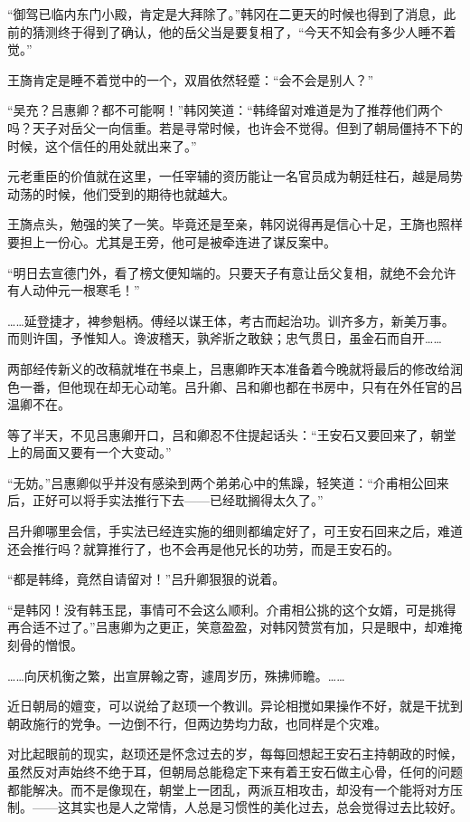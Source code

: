“御驾已临内东门小殿，肯定是大拜除了。”韩冈在二更天的时候也得到了消息，此前的猜测终于得到了确认，他的岳父当是要复相了，“今天不知会有多少人睡不着觉。”

王旖肯定是睡不着觉中的一个，双眉依然轻蹙：“会不会是别人？”

“吴充？吕惠卿？都不可能啊！”韩冈笑道：“韩绛留对难道是为了推荐他们两个吗？天子对岳父一向信重。若是寻常时候，也许会不觉得。但到了朝局僵持不下的时候，这个信任的用处就出来了。”

元老重臣的价值就在这里，一任宰辅的资历能让一名官员成为朝廷柱石，越是局势动荡的时候，他们受到的期待也就越大。

王旖点头，勉强的笑了一笑。毕竟还是至亲，韩冈说得再是信心十足，王旖也照样要担上一份心。尤其是王旁，他可是被牵连进了谋反案中。

“明日去宣德门外，看了榜文便知端的。只要天子有意让岳父复相，就绝不会允许有人动仲元一根寒毛！”

……延登捷才，裨参魁柄。傅经以谋王体，考古而起治功。训齐多方，新美万事。而则许国，予惟知人。谗波稽天，孰斧斨之敢鈌；忠气贯日，虽金石而自开……

两部经传新义的改稿就堆在书桌上，吕惠卿昨天本准备着今晚就将最后的修改给润色一番，但他现在却无心动笔。吕升卿、吕和卿也都在书房中，只有在外任官的吕温卿不在。

等了半天，不见吕惠卿开口，吕和卿忍不住提起话头：“王安石又要回来了，朝堂上的局面又要有一个大变动。”

“无妨。”吕惠卿似乎并没有感染到两个弟弟心中的焦躁，轻笑道：“介甫相公回来后，正好可以将手实法推行下去——已经耽搁得太久了。”

吕升卿哪里会信，手实法已经连实施的细则都编定好了，可王安石回来之后，难道还会推行吗？就算推行了，也不会再是他兄长的功劳，而是王安石的。

“都是韩绛，竟然自请留对！”吕升卿狠狠的说着。

“是韩冈！没有韩玉昆，事情可不会这么顺利。介甫相公挑的这个女婿，可是挑得再合适不过了。”吕惠卿为之更正，笑意盈盈，对韩冈赞赏有加，只是眼中，却难掩刻骨的憎恨。

……向厌机衡之繁，出宣屏翰之寄，遽周岁历，殊拂师瞻。……

近日朝局的嬗变，可以说给了赵顼一个教训。异论相搅如果操作不好，就是干扰到朝政施行的党争。一边倒不行，但两边势均力敌，也同样是个灾难。

对比起眼前的现实，赵顼还是怀念过去的岁，每每回想起王安石主持朝政的时候，虽然反对声始终不绝于耳，但朝局总能稳定下来有着王安石做主心骨，任何的问题都能解决。而不是像现在，朝堂上一团乱，两派互相攻击，却没有一个能将对方压制。——这其实也是人之常情，人总是习惯性的美化过去，总会觉得过去比较好。

